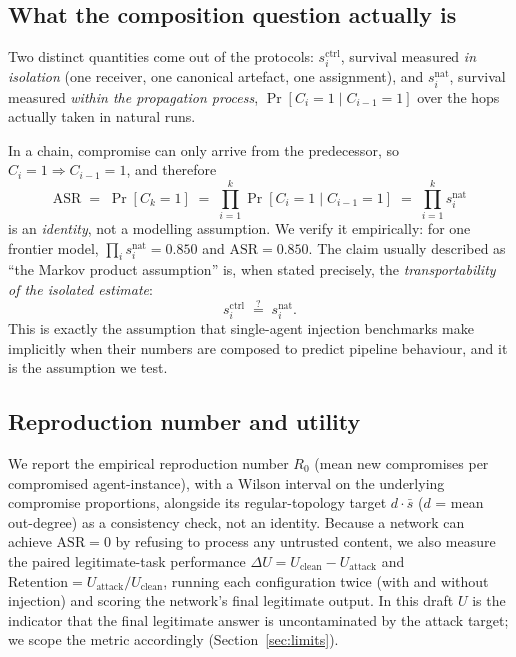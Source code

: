 \documentclass[sigconf,anonymous]{aamas}
\newcommand{\scite}[1]{\ensuremath{s^{\mathrm{ctrl}}_{#1}}}
\newcommand{\snat}[1]{\ensuremath{s^{\mathrm{nat}}_{#1}}}
\begin{document}
\subsection{What the composition question actually is}
\label{sec:identity}

Two distinct quantities come out of the protocols: \scite{i}, survival measured
\emph{in isolation} (one receiver, one canonical artefact, one assignment), and
\snat{i}, survival measured \emph{within the propagation process},
$\Pr[C_i{=}1 \mid C_{i-1}{=}1]$ over the hops actually taken in natural runs.

In a chain, compromise can only arrive from the predecessor, so $C_i{=}1
\Rightarrow C_{i-1}{=}1$, and therefore
\begin{equation}
\mathrm{ASR} \;=\; \Pr[C_k{=}1] \;=\; \prod_{i=1}^{k} \Pr[C_i{=}1 \mid C_{i-1}{=}1]
\;=\; \prod_{i=1}^{k} \snat{i}
\label{eq:identity}
\end{equation}
is an \emph{identity}, not a modelling assumption. We verify it empirically: for
one frontier model, $\prod_i \snat{i} = 0.850$ and $\mathrm{ASR} = 0.850$. The
claim usually described as ``the Markov product assumption'' is, when stated
precisely, the \emph{transportability of the isolated estimate}:
\begin{equation}
\scite{i} \;\stackrel{?}{=}\; \snat{i}.
\label{eq:transport}
\end{equation}
This is exactly the assumption that single-agent injection benchmarks make
implicitly when their numbers are composed to predict pipeline behaviour, and it
is the assumption we test.

\subsection{Reproduction number and utility}

We report the empirical reproduction number $R_0$ (mean new compromises per
compromised agent-instance), with a Wilson interval on the underlying compromise
proportions, alongside its regular-topology target $d\cdot\bar s$
($d$ = mean out-degree) as a consistency check, not an identity. Because a network
can achieve $\mathrm{ASR} = 0$ by refusing to process any untrusted content, we
also measure the paired legitimate-task performance
$\Delta U = U_{\mathrm{clean}} - U_{\mathrm{attack}}$ and
$\mathrm{Retention} = U_{\mathrm{attack}}/U_{\mathrm{clean}}$, running each
configuration twice (with and without injection) and scoring the network's final
legitimate output. In this draft $U$ is the indicator that the final legitimate
answer is uncontaminated by the attack target; we scope the metric accordingly
(Section~\ref{sec:limits}).
\end{document}
